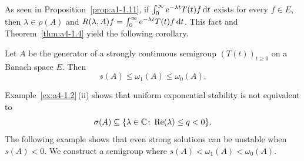 As seen in Proposition~\ref{prop:a1-1.11}, if\/ $\int_0^\infty \mathrm{e}^{-\lambda t} T(t) f  \mathop{}\!\mathrm{d}{t}$ exists for every $f \in E$, then $\lambda \in \rho(A)$ and $R(\lambda, A) f = \int_0^\infty \mathrm{e}^{-\lambda t} T(t) f  \mathop{}\!\mathrm{d}{t}$. 
This fact and Theorem~\ref{thm:a4-1.4} yield the following corollary.
\begin{corollary} \label{cor:a4-1.5}
Let $ A $ be the generator of a strongly continuous semigroup $ (T(t))_{t \geq 0} $ on a Banach space $ E $. 
Then  
\[
s(A) \leq \omega_1(A) \leq \omega_{0}(A).
\]
\end{corollary}
Example~\ref{ex:a4-1.2}\,(ii) shows that uniform exponential stability is not equivalent to 
%
\[
	\sigma(A) \subseteq \{\lambda \in \C \colon \Re(\lambda) \leq q < 0 \} .
\]
%
The following example shows that even strong solutions can be unstable when $ s(A) < 0 $. 
We construct a semigroup where $ s(A) < \omega_1(A) < \omega_{0}(A) $.
